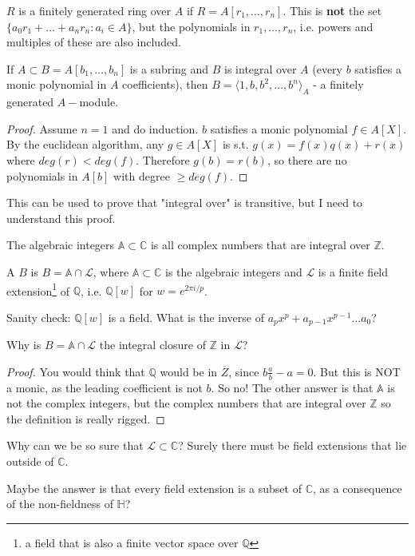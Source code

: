 $R$ is a finitely generated ring over $A$ if $R=A[r_1,\dots,r_n]$. This is \textbf{not} the set $\{a_0r_1+\dots+a_nr_n:a_i\in A\}$, but the polynomials in $r_1,\dots,r_n$, i.e. powers and multiples of these are also included.
\begin{prop}
If $A\subset B=A[b_1,\dots,b_n]$ is a subring and $B$ is integral over $A$ (every $b$ satisfies a monic polynomial in $A$ coefficients), then $B=\langle1,b,b^2,\dots,b^n\rangle_A$ - a finitely generated $A-$module. 
\end{prop}
\begin{proof}
Assume $n=1$ and do induction. $b$ satisfies a monic polynomial $f\in A[X]$. By the euclidean algorithm, any $g\in A[X]$ is s.t. $g(x)=f(x)q(x)+r(x)$ where $deg(r)<deg(f)$. Therefore $g(b)=r(b)$, so there are no polynomials in $A[b]$ with degree $\geq deg(f)$.
\end{proof}
This can be used to prove that "integral over" is transitive, but I need to understand this proof.

\begin{definition}
The algebraic integers $\mathbb{A}\subset \mathbb{C}$ is all complex numbers that are integral over $\mathbb{Z}$.
\end{definition}

\begin{definition}
A  $B$ is $B=\mathbb{A}\cap \mathcal{L}$, where $\mathbb{A}\subset \mathbb{C}$ is the algebraic integers and $\mathcal{L}$ is a finite field extension\footnote{a field that is also a finite vector space over $\mathbb{Q}$} of $\mathbb{Q}$, i.e. $\mathbb{Q}[w]$ for $w=e^{2\pi i/p}$.
\end{definition}

Sanity check: $\mathbb{Q}[w]$ is a field. What is the inverse of $a_px^p+a_{p-1}x^{p-1}\dots a_0$?

\begin{question}
Why is $B=\mathbb{A}\cap \mathcal{L}$ the integral closure of $\mathbb{Z}$ in $\mathcal{L}$?
\end{question}
\begin{proof}
You would think that $\mathbb{Q}$ would be in $\overline{Z}$, since $b\frac{a}{b}-a=0$. But this is NOT a monic, as the leading coefficient is not $b$. So no! The other answer is that $\mathbb{A}$ is not the complex integers, but the complex numbers that are integral over $\mathbb{Z}$ so the definition is really rigged.
\end{proof}

\begin{question}
Why can we be so sure that $\mathcal{L}\subset \mathbb{C}$? Surely there must be field extensions that lie outside of $\mathbb{C}$.
\end{question}
Maybe the answer is that every field extension is a subset of $\mathbb{C}$, as a consequence of the non-fieldness of $\mathbb{H}$?

